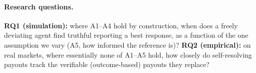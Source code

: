 \paragraph{Research questions.}
\textbf{RQ1 (simulation):} where A1--A4 hold by construction, when does a freely deviating
agent find truthful reporting a best response, as a function of the one assumption we vary
(A5, how informed the reference is)? \textbf{RQ2 (empirical):} on real markets, where
essentially none of A1--A5 hold, how closely do self-resolving payouts track the verifiable
(outcome-based) payouts they replace?
